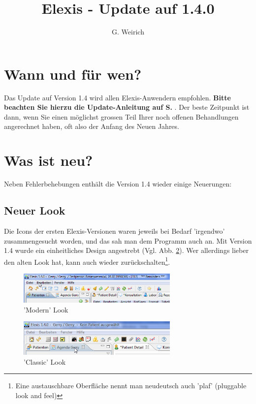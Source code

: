 \documentclass[a4paper]{scrartcl}
\begin{document}
\title{Elexis - Update auf 1.4.0}
\author{G. Weirich}

\maketitle
\tableofcontents

\section{Wann und für wen?}
Das Update auf Version 1.4 wird allen Elexis-Anwendern empfohlen. \textbf{Bitte beachten Sie hierzu die Update-Anleitung auf S. \pageref{update}}. Der beste Zeitpunkt ist dann, wenn Sie einen möglichst grossen Teil Ihrer noch offenen Behandlungen angerechnet haben, oft also der Anfang des Neuen Jahres.

\section{Was ist neu?}
Neben Fehlerbehebungen enthält die Version 1.4 wieder einige Neuerungen:

\subsection{Neuer Look}
Die Icons der ersten Elexis-Versionen waren jeweils bei Bedarf 'irgendwo' zusammengesucht worden, und das sah man dem Programm auch an. Mit Version 1.4 wurde ein einheitliches Design angestrebt (Vgl. Abb. \ref{fig:modern}). Wer allerdings lieber den alten Look hat, kann auch wieder zurückschalten\footnote{Eine austauschbare Oberfläche nennt man neudeutsch auch 'plaf' (pluggable look and feel)}.

\begin{figure}
    \center
  \includegraphics[width=0.7\textwidth]{modern}
  \caption{'Modern' Look}\label{fig:modern}
\end{figure}

\begin{figure}
\center
  \includegraphics[width=0.7\textwidth]{classic}
  \caption{'Classic' Look}\label{fig:modern}
\end{figure}
\end{document}
